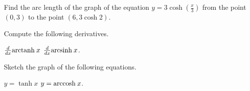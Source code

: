 \begin{exercises}
Find the arc length of the graph of the equation
$y=3\cosh \left(\frac x3\right)$
from the point $(0,3)$ to the point
$(6, 3\cosh 2)$.

Compute the following derivatives.
\begin{exenum}
\x
$\frac{d}{dx} \mathrm{arctanh\:} x$
\x
$\frac{d}{dx} \mathrm{arcsinh\:} x$.
\end{exenum}

Sketch the graph of the following equations.
\begin{exenum}
\x
$y = \tanh x$
\x
$y = \mathrm{arccosh\:} x$.
\end{exenum}


\end{exercises}
